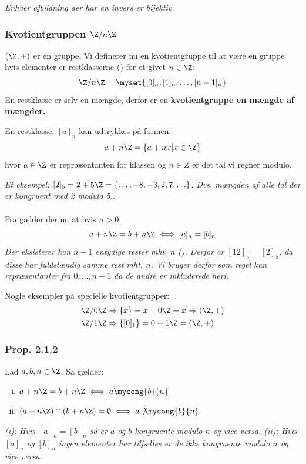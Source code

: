 \textit{Enhver afbildning der har en invers er bijektiv.}

\subsubsection{Kvotientgruppen $\Z/n\Z$}
\label{kvotientgruppe}
$(\Z, +)$ er en gruppe. Vi definerer nu en kvotientgruppe til at være en gruppe
hvis elementer er restklasserne () for et givet $n \in \Z$:
\begin{equation*}
  \Z/n\Z = \myset{[0]_n,[1]_n,\ldots,[n-1]_n}
\end{equation*}
En restklasse er selv en mængde, derfor er en \textbf{kvotientgruppe en mængde af
mængder.}

En restklasse, $[a]_n$ kan udtrykkes på formen:
\begin{equation*}
  a + n\Z = \{a + nx | x \in \Z\}
\end{equation*}
hvor $a \in \Z$ er repræsentanten for klassen og $n \in Z$ er det tal vi regner
modulo.

\textit{Et eksempel: $[2]_5 = 2 + 5\Z = \{\ldots, -8, -3, 2, 7, \ldots\}$. Dvs.
mængden af alle tal der er kongruent med 2 modulo 5.}.
\\
\\
Fra  gælder der nu at hvis $n > 0$:
\begin{equation*}
  a + n\Z = b + n\Z \iff [a]_n = [b]_n
\end{equation*}
\textit{Der eksisterer kun $n-1$ entydige rester mht. $n$ ().
Derfor er $[12]_5 = [2]_5$, da disse har fuldstændig samme rest mht. $n$. Vi bruger
derfor som regel kun repræsentanter fra $0,\ldots,n-1$ da de andre er
inkluderede heri.}

Nogle eksempler på specielle kvotientgrupper:
\begin{align*}
  &\Z/0\Z \Rightarrow \{x\} = x + 0\Z = x  \Rightarrow (\Z, +)\\
  &\Z/1\Z \Rightarrow \{[0]_1\} = 0 + 1\Z = (\Z, +)
\end{align*}

\subsubsection{Prop. 2.1.2}
\label{2.1.2}
Lad $a, b, n \in \Z$. Så gælder:
\begin{enumerate}[(i)]
  \item $a + n\Z = b + n\Z\\
  \iff a \mycong{b}{n}$

  \item $(a + n\Z) \cap (b + n\Z) = \emptyset\\
  \iff a \not \mycong{b}{n}$ 
\end{enumerate}
\textit{(i): Hvis $[a]_n = [b]_n$ så er $a$ og $b$ kongruente modulo $n$ og vice
versa. (ii): Hvis $[a]_n$ og $[b]_n$ ingen elementer har tilfælles er de ikke
kongruente modulo $n$ og vice versa.}


